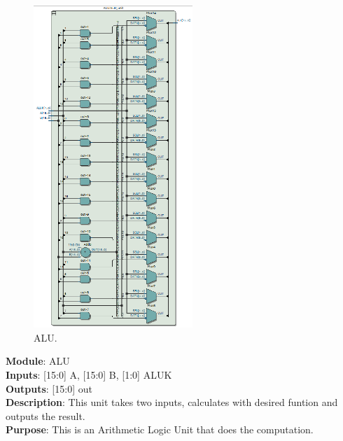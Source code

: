 \documentclass[12pt]{article}
\begin{document}
\begin{figure}[H]
    \centering
    \includegraphics[width=6cm]{alu.png}
    \caption{ALU.}
\end{figure}
\textbf{Module}: ALU \\ 
\textbf{Inputs}: [15:0] A, [15:0] B, [1:0] ALUK \\ 
\textbf{Outputs}: [15:0] out \\ 
\textbf{Description}: This unit takes two inputs, calculates with desired funtion and outputs the result. \\
\textbf{Purpose}: This is an Arithmetic Logic Unit that does the computation. \\
\end{document}
